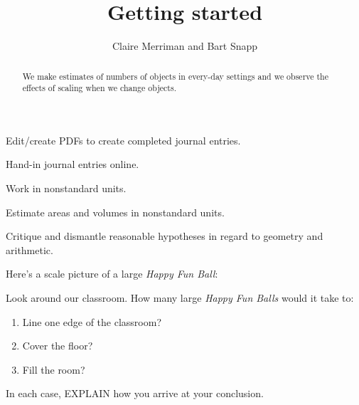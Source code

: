 \documentclass[handout,noauthor,nooutcomes,hints,12pt]{ximera}
\title{Getting started}
\author{Claire Merriman and Bart Snapp}
\begin{document}
\begin{abstract}
  We make estimates of numbers of objects in every-day settings and we
  observe the effects of scaling when we change objects.
\end{abstract}
\maketitle



\begin{listOutcomes}
\item{Edit/create PDFs to create completed journal entries.}
\item{Hand-in journal entries online.}
\item{Work in nonstandard units.}
\item{Estimate areas and volumes in nonstandard units.}
\item{Critique and dismantle reasonable hypotheses in regard to geometry and arithmetic.}
\end{listOutcomes}

\mynewpage


\begin{question}
  Here's a scale picture of a large \textit{Happy Fun Ball}:
  \begin{center}
  \end{center}
Look around our classroom. How many large \textit{Happy Fun Balls}
would it take to:
\begin{enumerate}
\item Line one edge of the classroom?
 \item Cover the floor?
 \item Fill the room?
\end{enumerate}
In each case, EXPLAIN how you arrive at your conclusion.
\end{question}
\mynewpage
\end{document}
